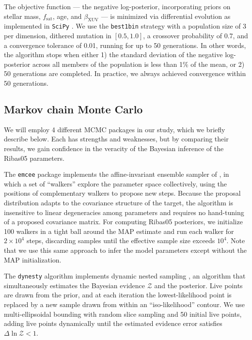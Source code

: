 \documentclass[preprint]{aastex631}
\begin{document}
The objective function --- the negative log-posterior, incorporating
priors on stellar mass, $f_{\mathrm{sat}}$, age, and
$\beta_{\mathrm{XUV}}$ --- is minimized via differential evolution
\citep{StornPrice97} as implemented in \texttt{SciPy}
\citep{Virtanen20}. We use the \texttt{best1bin} strategy with a
population size of 3 per dimension, dithered mutation in $[0.5, 1.0]$,
a crossover probability of 0.7, and a convergence tolerance of 0.01,
running for up to 50 generations. In other words, the algorithm stops when either 1)  
the standard deviation of the negative log-posterior across all members of the population is less than 1\% of the mean, or 2) 50 generations are completed. In practice, we always achieved convergence within 50 generations.

\subsection{Markov chain Monte Carlo}

We will employ 4 different MCMC packages in our study, which we briefly describe below. Each has strengths and weaknesses, but by comparing their results, we gain confidence in the veracity of the Bayesian inference of the Ribas05 parameters.

The \texttt{emcee} package \citep{ForemanMackey13} implements the
affine-invariant ensemble sampler of \citet{GoodmanWeare10}, in which
a set of ``walkers'' explore the parameter space collectively, using
the positions of complementary walkers to propose new steps. Because
the proposal distribution adapts to the covariance structure of the
target, the algorithm is insensitive to linear degeneracies among
parameters and requires no hand-tuning of a proposed covariance
matrix. For computing Ribas05 posteriors, we initialize 100 walkers in a tight ball around the MAP estimate and run each walker for $2\times10^{4}$ steps, discarding
samples until the effective sample size exceeds $10^{4}$.  Note that we use this same approach to infer the \citet{Davenport19} model parameters except without the MAP initialization.

The \texttt{dynesty} algorithm \citep{Speagle20} implements dynamic nested sampling
\citep{Skilling04,Higson19}, an algorithm that simultaneously
estimates the Bayesian evidence $\mathcal{Z}$ and the posterior. Live
points are drawn from the prior, and at each iteration the
lowest-likelihood point is replaced by a new sample drawn from within
an ``iso-likelihood'' contour. We use multi-ellipsoidal bounding with
random slice sampling \citep{Handley15a,Handley15b} and 50 initial
live points, adding live points dynamically until the estimated
evidence error satisfies $\Delta\ln\mathcal{Z} < 1$.
\end{document}
